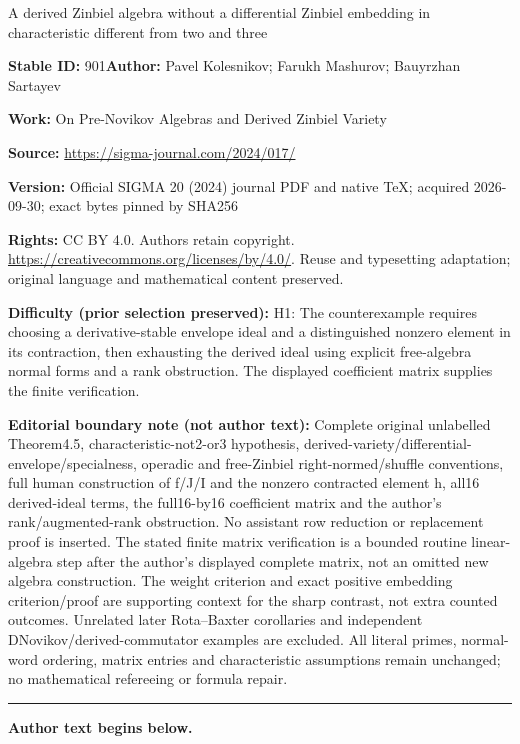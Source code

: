 \documentclass[11pt]{article}
\numberwithin{equation}{section}
\numberwithin{equation}{section}
\begin{document}
\begin{center}\Large A derived Zinbiel algebra without a differential Zinbiel embedding in characteristic different from two and three\end{center}
\noindent\textbf{Stable ID:} 901\quad\textbf{Author:} Pavel Kolesnikov; Farukh Mashurov; Bauyrzhan Sartayev\par
\noindent\textbf{Work:} On Pre-Novikov Algebras and Derived Zinbiel Variety\par
\noindent\textbf{Source:} \url{https://sigma-journal.com/2024/017/}\par
\noindent\textbf{Version:} Official SIGMA 20 (2024) journal PDF and native TeX; acquired 2026-09-30; exact bytes pinned by SHA256\par
\noindent\textbf{Rights:} CC BY 4.0. Authors retain copyright. \url{https://creativecommons.org/licenses/by/4.0/}. Reuse and typesetting adaptation; original language and mathematical content preserved.\par
\noindent\textbf{Difficulty (prior selection preserved):} {\CJKfont H1: The counterexample requires choosing a derivative-stable envelope ideal and a distinguished nonzero element in its contraction, then exhausting the derived ideal using explicit free-algebra normal forms and a rank obstruction. The displayed coefficient matrix supplies the finite verification.}\par
\medskip\noindent\textbf{Editorial boundary note (not author text):} Complete original unlabelled Theorem4.5, characteristic-not2-or3 hypothesis, derived-variety/differential-envelope/specialness, operadic and free-Zinbiel right-normed/shuffle conventions, full human construction of f/J/I and the nonzero contracted element h, all16 derived-ideal terms, the full16-by16 coefficient matrix and the author’s rank/augmented-rank obstruction. No assistant row reduction or replacement proof is inserted. The stated finite matrix verification is a bounded routine linear-algebra step after the author’s displayed complete matrix, not an omitted new algebra construction. The weight criterion and exact positive embedding criterion/proof are supporting context for the sharp contrast, not extra counted outcomes. Unrelated later Rota–Baxter corollaries and independent DNovikov/derived-commutator examples are excluded. All literal primes, normal-word ordering, matrix entries and characteristic assumptions remain unchanged; no mathematical refereeing or formula repair.\par
\medskip\hrule\medskip\noindent\textbf{Author text begins below.}\par
\end{document}
